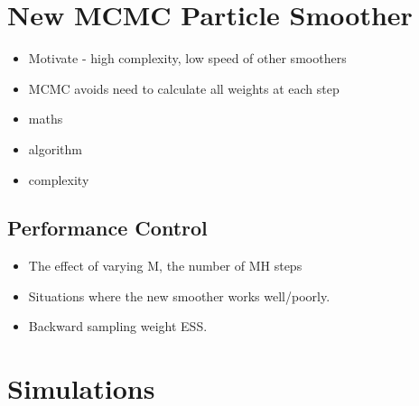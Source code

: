 \documentclass[journal]{IEEEtran}
\begin{document}
\section{New MCMC Particle Smoother}

\begin{itemize}
	\item Motivate - high complexity, low speed of other smoothers
	\item MCMC avoids need to calculate all weights at each step
	\item maths
	\item algorithm
	\item complexity
\end{itemize}

\subsection{Performance Control}

\begin{itemize}
	\item The effect of varying M, the number of MH steps
	\item Situations where the new smoother works well/poorly.
	\item Backward sampling weight ESS.
\end{itemize}



\section{Simulations}






%
%
\end{document}
